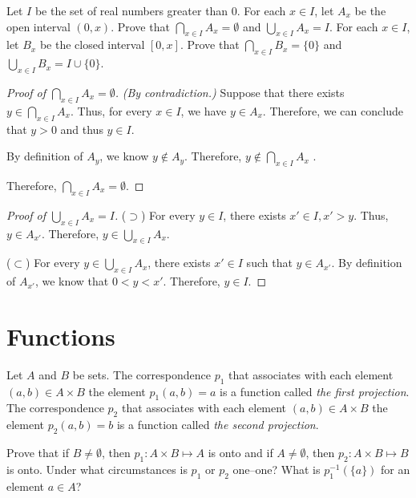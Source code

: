 \begin{problem}[5]
	Let $I$ be the set of real numbers greater than 0. For each $x \in I$, let $A_x$ be the open interval $(0,x)$.
	Prove that $\bigcap_{x \in I} A_x = \emptyset$ and $\bigcup_{x \in I} A_x = I$.
	For each $x \in I$, let $B_x$ be the closed interval $[0,x]$.
	Prove that $\bigcap_{x \in I} B_x = \{0\}$ and $\bigcup_{x \in I} B_x = I \cup \{0\}$.
\end{problem}


\begin{proof}[Proof of $\bigcap_{x \in I} A_x = \emptyset$]
	\textit{(By contradiction.)}
	Suppose that there exists $y \in \bigcap_{x \in I} A_x$.
	Thus, for every $x \in I$, we have $y \in A_x$.
	Therefore, we can conclude that $y > 0$ and thus $y \in I$.

	By definition of $A_y$, we know $y \notin A_y$.
	Therefore, $y \notin \bigcap_{x \in I} A_x$ \contradiction.

	Therefore, $\bigcap_{x \in I} A_x = \emptyset$.
\end{proof}

\begin{proof}[Proof of $\bigcup_{x \in I} A_x = I$]
	($\supset$) For every $y \in I$, there exists $x' \in I, x' > y$. Thus, $y \in A_{x'}$.
	Therefore, $y \in \bigcup_{x \in I} A_x$.

	($\subset$) For every $y \in \bigcup_{x \in I} A_x$, there exists $x' \in I$ such that $y \in A_{x'}$.
	By definition of $A_{x'}$, we know that $0 < y < x'$.
	Therefore, $y \in I$.
\end{proof}



\setcounter{section}{5}
\section{Functions}
\begin{problem}[5]
	Let $A$ and $B$ be sets.
	The correspondence $p_1$ that associates with each element $(a,b) \in A \times B$ the element $p_1(a,b) = a$ is a function called \textit{the first projection}.
	The correspondence $p_2$ that associates with each element $(a,b) \in A \times B$ the element $p_2(a,b) = b$ is a function called \textit{the second projection}.

	Prove that if $B \neq \emptyset$, then $p_1 : A \times B \mapsto A$ is onto and if $A \neq \emptyset$, then $p_2 : A \times B \mapsto B$ is onto.
	Under what circumstances is $p_1$ or $p_2$ one--one?
	What is $p_1^{-1}(\{a\})$ for an element $a \in A$?
\end{problem}

